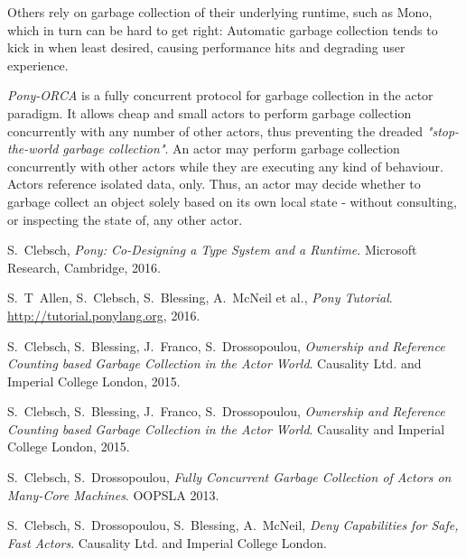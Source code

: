 \documentclass[9pt,conference]{IEEEtran}
\begin{document}
Others rely on garbage collection of their underlying runtime, such
as Mono, which in turn can be hard to get right: Automatic garbage collection
tends to kick in when least desired, causing performance hits and degrading
user experience.

\emph{Pony-ORCA} is a fully concurrent protocol for garbage collection in the
actor paradigm. It allows cheap and small actors to perform garbage collection
concurrently with any number of other actors, thus preventing the dreaded
\emph{"stop-the-world garbage collection"}.
An actor may perform garbage collection concurrently with other
actors while they are executing any kind of behaviour. Actors reference
isolated data, only. Thus, an actor may decide whether to garbage collect an
object solely based on its own local state - without consulting, or
inspecting the state of, any other actor.


\begin{thebibliography}{1}

S.~Clebsch, \emph{Pony: Co-Designing a Type System and a Runtime}.
Microsoft Research, Cambridge, 2016.

S.~T~Allen, S.~Clebsch, S.~Blessing, A.~McNeil et al., \emph{Pony Tutorial}.
\url{http://tutorial.ponylang.org}, 2016.

S.~Clebsch, S.~Blessing, J.~Franco, S.~Drossopoulou, \emph{Ownership and
Reference Counting based Garbage Collection in the Actor World}.
Causality Ltd. and Imperial College London, 2015.

S.~Clebsch, S.~Blessing, J.~Franco, S.~Drossopoulou, \emph{Ownership and
Reference Counting based Garbage Collection in the Actor World}. Causality
and Imperial College London, 2015.

S.~Clebsch, S.~Drossopoulou, \emph{Fully Concurrent Garbage Collection of
Actors on Many-Core Machines}. OOPSLA 2013.

S.~Clebsch, S.~Drossopoulou, S.~Blessing, A.~McNeil, \emph{Deny Capabilities
for Safe, Fast Actors}. Causality Ltd. and Imperial College London.

\end{thebibliography}
\end{document}
